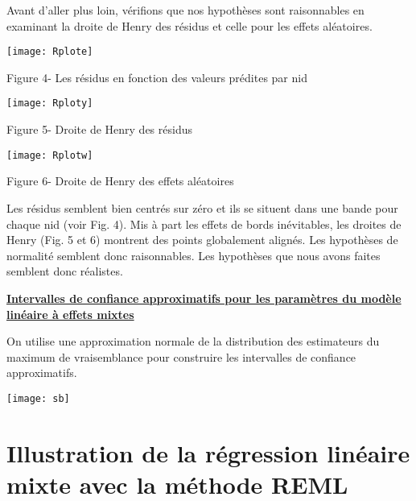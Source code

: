 \documentclass[11pt,fleqn]{book} %
\begin{document}
Avant d'aller plus loin, vérifions que nos hypothèses sont raisonnables en examinant la droite de Henry des résidus et celle pour les effets aléatoires.


\newpage

\texttt{[image: Rplote]}
\begin{center} Figure 4-  Les résidus en fonction des valeurs prédites par nid  \end{center}

\vspace{2em}

\texttt{[image: Rploty]}
\begin{center} Figure 5- Droite de Henry des résidus    \end{center}

\texttt{[image: Rplotw]}
\begin{center} Figure 6- Droite de Henry des effets aléatoires  \end{center}

\vspace{2em}

Les résidus semblent bien centrés sur zéro et ils se situent dans une bande pour chaque nid (voir Fig. 4).
Mis à part les effets de bords inévitables, les droites de Henry (Fig. 5 et 6) montrent des points globalement alignés. Les hypothèses de normalité semblent donc raisonnables. Les hypothèses que nous avons faites semblent donc réalistes.

\newpage

\underline{\textbf{Intervalles de confiance approximatifs pour les paramètres du modèle linéaire à effets mixtes}}

\vspace{0.5em}

On utilise une approximation normale de la distribution des estimateurs du maximum de vraisemblance pour construire les intervalles de confiance approximatifs.

\vspace{2em}


\vspace{2em}

\texttt{[image: sb]}


\newpage

\section{Illustration de la régression linéaire mixte avec la méthode REML }
\end{document}
